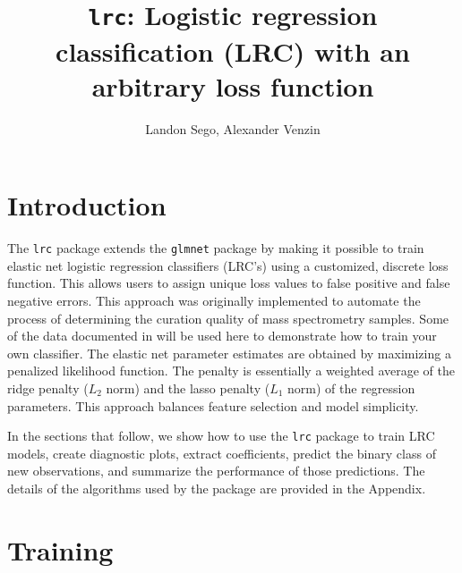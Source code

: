 \documentclass{article}
\begin{document}
 


\title{{\tt lrc}: Logistic regression classification (LRC) with an arbitrary loss function\\}
\author{Landon Sego, Alexander Venzin}
\maketitle

\section{Introduction}

The {\tt lrc} package extends the {\tt glmnet} package by making it possible to train elastic net logistic 
regression classifiers (LRC's) using a customized, discrete loss function.  This allows users to assign unique 
loss values to false positive and false negative errors. This approach was originally implemented to automate the
process of determining the curation quality of mass spectrometry samples. Some of the data documented in 
\cite{thepaper} will be used here to demonstrate how to train your own classifier. The elastic net parameter
estimates are obtained by maximizing a penalized likelihood function. The penalty is essentially a weighted average
of the ridge penalty ($L_2$ norm) and the lasso penalty ($L_1$ norm) of the regression parameters.  This
approach balances feature selection and model simplicity. 

In the sections that follow, we show how to use the {\tt lrc} package to train LRC models, create diagnostic plots,
extract coefficients, predict the binary class of new observations, and summarize the performance of those
predictions. The details of the algorithms used by the package are provided in the Appendix.

\section{Training}
\end{document}
